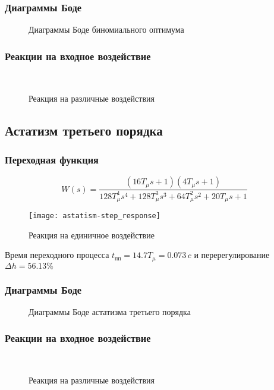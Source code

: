 			\subsubsection{Диаграммы Боде}
				\begin{figure}[H]
					\centering
					\caption{Диаграммы Боде биномиального оптимума}
				\end{figure}
			\subsubsection{Реакции на входное воздействие}
				\begin{figure}[H]
					\centering
					\\
					\centering{}
					\caption{Реакция на различные воздействия}
				\end{figure}
		\newpage
		\subsection{Астатизм третьего порядка}
			\subsubsection{Переходная функция}
				$$W(s)=\frac{(16T_\mu s+1)(4T_\mu s+1)}{128T_\mu^4 s^4+128T_\mu^3s^3+64T_\mu^2 s^2+20T_\mu s+1}$$
				\begin{figure}[H]
					\centering
					\texttt{[image: astatism-step\_response]}
					\caption{Реакция на единичное воздействие}
				\end{figure}
				Время переходного процесса $t_{\text{пп}}=14.7T_{\mu}=0.073\,c$ и перерегулирование $\Delta h=56.13\%$
			\subsubsection{Диаграммы Боде}
				\begin{figure}[H]
					\centering
					\caption{Диаграммы Боде астатизма третьего порядка}
				\end{figure}
			\subsubsection{Реакции на входное воздействие}
				\begin{figure}[H]
					\centering
					\\
					\centering{}
					\caption{Реакция на различные воздействия}
				\end{figure}
